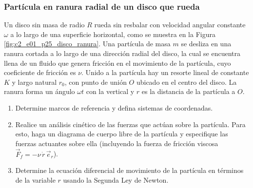 \subsubsection{Partícula en ranura radial de un disco que rueda}

Un disco sin masa de radio $R$ rueda sin resbalar con velocidad angular constante $\omega$ a lo largo de una superficie horizontal, como se muestra en la Figura \ref{fig:c2_e01_p25_disco_ranura}. Una partícula de masa $m$ se desliza en una ranura cortada a lo largo de una dirección radial del disco, la cual se encuentra llena de un fluido que genera fricción en el movimiento de la partícula, cuyo coeficiente de fricción es $\nu$. Unido a la partícula hay un resorte lineal de constante $K$ y largo natural $r_0$, con punto de unión $O$ ubicado en el centro del disco. La ranura forma un ángulo $\omega t$ con la vertical y $r$ es la distancia de la partícula a $O$.

\begin{enumerate}
    \item Determine marcos de referencia y defina sistemas de coordenadas.
    \item Realice un análisis cinético de las fuerzas que actúan sobre la partícula. Para esto, haga un diagrama de cuerpo libre de la partícula y especifique las fuerzas actuantes sobre ella (incluyendo la fuerza de fricción viscosa $\vec{F}_f = -\nu\,\dot{r}\,\vec{e}_r$).
    \item Determine la ecuación diferencial de movimiento de la partícula en términos de la variable $r$ usando la Segunda Ley de Newton.
\end{enumerate}

